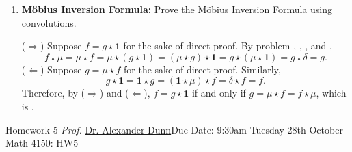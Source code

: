 \begin{enumerate}
\begin{enumerate}
    \item \textbf{Möbius Inversion Formula:} Prove the Möbius Inversion Formula using convolutions.\newline
    [Hint: Theorem 3.5 can be restated as $f=g \star \mathbf{1}$ if and only if $g=\mu \star f=f \star \mu$.]
    \begin{subprove}
      ($\Rightarrow$) Suppose $f = g \star \mathbf{1}$ for the sake of direct proof. 
      By problem , , , and ,
      \[
      f \star \mu = \mu \star f = \mu \star (g \star \mathbf{1}) = (\mu \star g) \star \mathbf{1} = g \star (\mu \star \mathbf{1}) = g \star \delta = g.
      \]
      ($\Leftarrow$) Suppose $g = \mu \star f$ for the sake of direct proof. Similarly,
      \[
      g \star \mathbf{1} = \mathbf{1} \star g = (\mathbf{1} \star \mu) \star f = \delta \star f = f.
      \]
      Therefore, by ($\Rightarrow$) and ($\Leftarrow$), $f = g \star \mathbf{1}$ if and only if $g = \mu \star f = f \star \mu$, which is .
    \end{subprove}
  \end{enumerate}

\end{enumerate}





\newpage{}
{Homework 5}
{\textit{Prof.} \href{https://alexjdunn.weebly.com/}{Dr. Alexander Dunn}}{Due Date: 9:30am Tuesday 28th October}
{Math 4150: HW5}


\newpage

